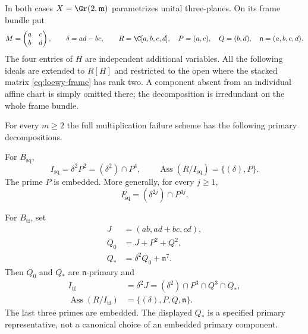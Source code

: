 In both cases $X=\Gr(2,\mathfrak m)$ parametrizes unital
three-planes. On its frame bundle put
\[
 M=\begin{pmatrix}a&c\\b&d\end{pmatrix},\qquad
 \delta=ad-bc,\qquad
 R=\C[a,b,c,d],\quad P=(a,c),\quad Q=(b,d),\quad
 \mathfrak n=(a,b,c,d).
\]
The four entries of $H$ are independent additional variables.
All the following ideals are extended to $R[H]$ and restricted to
the open where the stacked matrix \eqref{eq:loewy-frame} has rank two.
A component absent from an individual affine chart is simply omitted
there; the decomposition is irredundant on the whole frame bundle.

\begin{theorem}
\label{thm:loewy-primary}
For every $m\ge2$ the full multiplication failure scheme has the
following primary decompositions.

For $B_{\mathrm{sq}}$,
\begin{equation}\label{eq:loewy-square-primary}
 I_{\mathrm{sq}}=\delta^2P^2=(\delta^2)\cap P^4,
 \qquad
 \operatorname{Ass}(R/I_{\mathrm{sq}})=\{(\delta),P\}.
\end{equation}
The prime $P$ is embedded. More generally, for every $j\ge1$,
\begin{equation}\label{eq:loewy-square-powers}
 I_{\mathrm{sq}}^j=(\delta^{2j})\cap P^{4j}.
\end{equation}

For $B_{\mathrm{tf}}$, set
\begin{equation}\label{eq:loewy-mixed-ideals}
 \begin{split}
 J&=(ab,ad+bc,cd),\\
 Q_0&=J+P^2+Q^2,\\
 Q_*&=\delta^2Q_0+\mathfrak n^7.
 \end{split}
\end{equation}
Then $Q_0$ and $Q_*$ are $\mathfrak n$-primary and
\begin{equation}\label{eq:loewy-two-factor-primary}
 \begin{split}
 I_{\mathrm{tf}}&=\delta^2J
       =(\delta^2)\cap P^3\cap Q^3\cap Q_*,\\
 \operatorname{Ass}(R/I_{\mathrm{tf}})
       &=\{(\delta),P,Q,\mathfrak n\}.
 \end{split}
\end{equation}
The last three primes are embedded. The displayed $Q_*$ is a
specified primary representative, not a canonical choice of an
embedded primary component.


\end{theorem}
